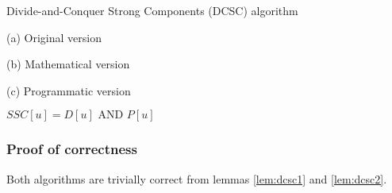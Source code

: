 \begin{center}
    \begin{algorithm}[H]
        \caption{Divide-and-Conquer Strong Components (DCSC) algorithm}
        \label{alg-dcsc}
        \begin{minipage}[t]{0.49\linewidth}
            (a) Original version
            \begin{algorithmic}[1]
                     
                     
                     
                    \State {}
                \EndFunction
            \end{algorithmic}
        \end{minipage}
        \begin{minipage}[t]{0.49\linewidth}
            (b) Mathematical version
            \begin{algorithmic}[1]
                     
                     
                    \State {}
                \EndFunction
            \end{algorithmic}
            (c) Programmatic version
            \begin{algorithmic}[1]
                     
                     
                     {$SSC[u] = D[u] \text{ AND } P[u]$}
                    \EndFor
                    \State {}
                \EndFunction
            \end{algorithmic}
        \end{minipage}
    \end{algorithm}
\end{center}
\subsubsection{Proof of correctness}
Both algorithms are trivially correct from lemmas \ref{lem:dcsc1} and \ref{lem:dcsc2}.
